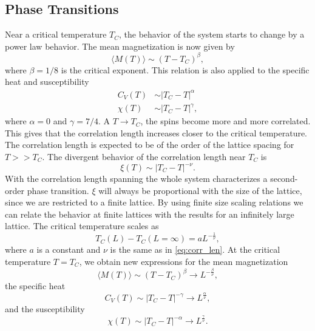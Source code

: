 \documentclass[12pt,a4paper,english]{article}
\begin{document}
\subsection{Phase Transitions}
\label{subsect:Phase_trans}
Near a critical temperature $T_C$, the behavior of the system starts to change by a power law behavior. The mean magnetization is now given by
\begin{equation}
\label{eq:mag_TC}
\langle M(T)\rangle\sim(T-T_C)^{\beta},
\end{equation}
where $\beta=1/8$ is the critical exponent. This relation is also applied to the specific heat and susceptibility
\begin{align}
\label{eq:CV_TC}
C_V(T)&\sim |T_C-T|^{\alpha}\\
\label{eq:Xi_TC}
\chi(T)&\sim |T_C-T|^{\gamma},
\end{align}
where $\alpha=0$ and $\gamma=7/4$. A $T\rightarrow T_C$, the spins become more and more correlated. This gives that the correlation length increases closer to the critical temperature. The correlation length is expected to be of the order of the lattice spacing for $T>>T_C$. The divergent behavior of the correlation length near $T_C$ is 
\begin{equation}
\label{eq:corr_len}
\xi(T)\sim |T_C-T|^{-\nu}.
\end{equation}
With the correlation length spanning the whole system characterizes a second-order phase transition. $\xi$ will always be proportional with the size of the lattice, since we are restricted to a finite lattice. By using finite size scaling relations we can relate the behavior at finite lattices with the results for an infinitely large lattice. The critical temperature scales as
\begin{equation}
\label{eq:TC_scale}
T_C(L)-T_C(L=\infty)=aL^{-\frac{1}{\nu}},
\end{equation}
where $a$ is a constant and $\nu$ is the same as in \ref{eq:corr_len}. At the critical temperature $T=T_C$, we obtain new expressions for the mean magnetization
\begin{equation}
\label{eq:crit_M}
\langle M(T)\rangle\sim(T-T_C)^{\beta}\rightarrow L^{-\frac{\beta}{\nu}},
\end{equation}
the specific heat 
\begin{equation}
\label{eq:crit_CV}
C_V(T)\sim |T_C-T|^{-\gamma}\rightarrow L^{\frac{\alpha}{\nu}},
\end{equation}
and the susceptibility
\begin{equation}
\label{eq:crit_xi}
\chi(T)\sim |T_C-T|^{-\alpha}\rightarrow L^{\frac{\gamma}{\nu}}.
\end{equation}
\end{document}
